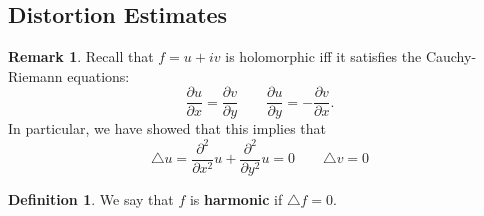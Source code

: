 \documentclass[10pt, oneside]{article}
\theoremstyle{definition}
\newtheorem{defn}{Definition}
\newtheorem{rem}{Remark}
\begin{document}
\newpage
\subsection{Distortion Estimates}

\begin{rem}
    Recall that $f = u + iv$ is holomorphic iff it satisfies the Cauchy-Riemann equations:
    \[\frac{\partial u}{\partial x} = \frac{\partial v}{\partial y} \qquad \frac{\partial u}{\partial y} = - \frac{\partial v}{\partial x}.\] In particular, we have showed that this implies that 
    \[\triangle u = \frac{\partial^2}{\partial x^2}u + \frac{\partial^2}{\partial y^2} u  = 0 \qquad \triangle v = 0\]
\end{rem}
\begin{defn}
    We say that $f$ is \textbf{harmonic} if $\triangle f = 0.$
\end{defn}
\end{document}
